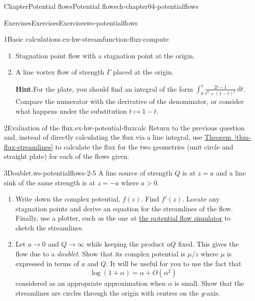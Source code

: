 \documentclass[oneside,10pt,]{book}
\newcommand{\blocktitlefont}{\relax}
\newcommand{\xreffont}{\relax}
\numberwithin{equation}{section}
\newcommand{\de}{\mathrm{d}}
\begin{document}
\begin{chapterptx}{Chapter}{Potential flows}{}{Potential flows}{}{}{ch-chapter04-potentialflows}
\begin{exercises-section}{Exercises}{Exercises}{}{Exercises}{}{}{ws-potentialflows}
\begin{exercisegroup}
\begin{divisionexerciseeg}{1}{Basic calculations.}{}{ex-hw-streamfunction-flux-compute}
\begin{enumerate}[font=\bfseries,label=(\alph*),ref=\alph*]
\begin{equation*}
\int_0^1 \frac{\de{t}}{t^2 + (1 - t)^2} = \frac{\pi}{2}.
\end{equation*}
%
\item{}Stagnation point flow with a stagnation point at the origin.%
\item{}A line vortex flow of strength \(\Gamma\) placed at the origin.%
\par\smallskip%
\noindent\textbf{\blocktitlefont Hint}.\hypertarget{ex-hw-streamfunction-flux-compute-6-2}{}\quad{}For the plate, you should find an integral of the form \(\int_0^1 \frac{2t - 1}{t^2 + (1 - t)^2}\,\de{t}\). Compare the numerator with the derivative of the denominator, or consider what happens under the substitution \(t \mapsto 1 - t\).%
\end{enumerate}%
\end{divisionexerciseeg}%
\begin{divisionexerciseeg}{2}{Evaluation of the flux.}{}{ex-hw-potential-fluxcalc}%
Return to the previous question and, instead of directly calculating the flux via a line integral, use \hyperref[thm-flux-streamlines]{Theorem~{\xreffont\ref{thm-flux-streamlines}}} to calculate the flux for the two geometries (unit circle and straight plate) for each of the flows given.%
\end{divisionexerciseeg}%
\begin{divisionexerciseeg}{3}{Doublet.}{}{ws-potentialflows-2-5}%
A line source of strength \(Q\) is at \(z = a\) and a line sink of the same strength is at \(z = -a\) where \(a > 0\).%
\begin{enumerate}[font=\bfseries,label=(\alph*),ref=\alph*]%
\item{}Write down the complex potential, \(f(z)\). Find \(f'(z)\). Locate any stagnation points and derive an equation for the streamlines of the flow. Finally, use a plotter, such as the one at \href{https://potentialflow.com/}{the potential flow simulator} to sketch the streamlines.%
\item{}Let \(a \to 0\) and \(Q \to \infty\) while keeping the product \(aQ\) fixed. This gives the flow due to a \emph{doublet}. Show that its complex potential is \(\mu/z\) where \(\mu\) is expressed in terms of \(a\) and \(Q\). It will be useful for you to use the fact that%
\begin{equation*}
\log(1 + \alpha) = \alpha + O(\alpha^2)
\end{equation*}
considered as an appropriate approximation when \(\alpha\) is small. Show that the streamlines are circles through the origin with centres on the \(y\)-axis.%

\end{enumerate}
\end{divisionexerciseeg}
\end{exercisegroup}
\end{exercises-section}
\end{chapterptx}
\end{document}
